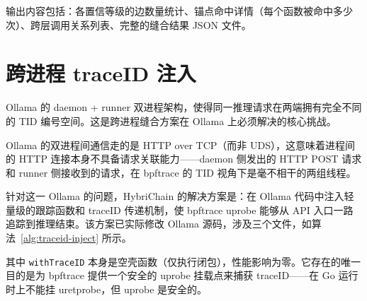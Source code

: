 输出内容包括：各置信等级的边数量统计、锚点命中详情（每个函数被命中多少次）、跨层调用关系列表、完整的缝合结果 JSON 文件。

\section{跨进程 traceID 注入}

Ollama 的 daemon + runner 双进程架构，使得同一推理请求在两端拥有完全不同的 TID 编号空间。这是跨进程缝合方案在 Ollama 上必须解决的核心挑战。

Ollama 的双进程间通信走的是 HTTP over TCP（而非 UDS），这意味着进程间的 HTTP 连接本身不具备请求关联能力——daemon 侧发出的 HTTP POST 请求和 runner 侧接收到的请求，在 bpftrace 的 TID 视角下是毫不相干的两组线程。

针对这一 Ollama 的问题，HybriChain 的解决方案是：在 Ollama 代码中注入轻量级的跟踪函数和 traceID 传递机制，使 bpftrace uprobe 能够从 API 入口一路追踪到推理结束。该方案已实际修改 Ollama 源码，涉及三个文件，如算法~\ref{alg:traceid-inject} 所示。

\begin{algorithm}[H]
\caption{traceID 注入：三文件具体改动}
\label{alg:traceid-inject}
\DontPrintSemicolon
{}

\BlankLine
{}
\BlankLine
{}
\BlankLine
{}
\end{algorithm}

其中 \texttt{withTraceID} 本身是空壳函数（仅执行闭包），性能影响为零。它存在的唯一目的是为 bpftrace 提供一个安全的 uprobe 挂载点来捕获 traceID——在 Go 运行时上不能挂 uretprobe，但 uprobe 是安全的。

